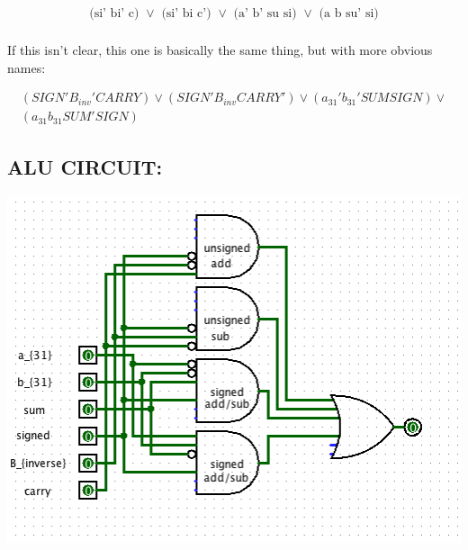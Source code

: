 \documentclass[a4paper]{article}
\begin{document}
\begin{eqnarray*} 
\mbox{(si' bi' c) $\vee$ (si' bi c') $\vee$ (a' b' su si) $\vee$ (a b su' si)} \\
\end{eqnarray*}

If this isn't clear, this one is basically the same thing, but with more obvious names:

\begin{eqnarray*}
(SIGN' B_{inv}' CARRY) \vee (SIGN' B_{inv} CARRY') \vee (a_{31}' b_{31}' SUM SIGN) \vee \\
(a_{31} b_{31} SUM' SIGN)
\end{eqnarray*}

\subsection*{ALU CIRCUIT:}

\includegraphics[width=150mm]{alu.png}
\end{document}
